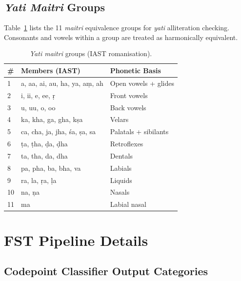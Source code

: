 \documentclass[11pt]{article}
\begin{document}
\subsection{\textit{Yati Maitri} Groups}
\label{app:yati}

Table~\ref{tab:yati} lists the 11 \textit{maitri} equivalence groups for
\textit{yati} alliteration checking. Consonants and vowels within a group are
treated as harmonically equivalent.

\begin{table}[H]
\centering
\small
\caption{\textit{Yati maitri} groups (IAST romanisation).}
\label{tab:yati}
\begin{tabular}{p{0.35cm}p{4.0cm}p{2.8cm}}
\toprule
\textbf{\#} & \textbf{Members (IAST)} & \textbf{Phonetic Basis} \\
\midrule
1  & a, aa, ai, au, ha, ya, a\d{m}, ah
   & Open vowels + glides \\
2  & i, ii, e, ee, \d{r}
   & Front vowels \\
3  & u, uu, o, oo
   & Back vowels \\
4  & ka, kha, ga, gha, k\d{s}a
   & Velars \\
5  & ca, cha, ja, jha, \'{s}a, \d{s}a, sa
   & Palatals + sibilants \\
6  & \d{t}a, \d{t}ha, \d{d}a, \d{d}ha
   & Retroflexes \\
7  & ta, tha, da, dha
   & Dentals \\
8  & pa, pha, ba, bha, va
   & Labials \\
9  & ra, la, \d{r}a, \d{l}a
   & Liquids \\
10 & na, \d{n}a
   & Nasals \\
11 & ma
   & Labial nasal \\
\bottomrule
\end{tabular}
\end{table}

\section{FST Pipeline Details}
\label{app:fst}

\subsection{Codepoint Classifier Output Categories}
\end{document}
